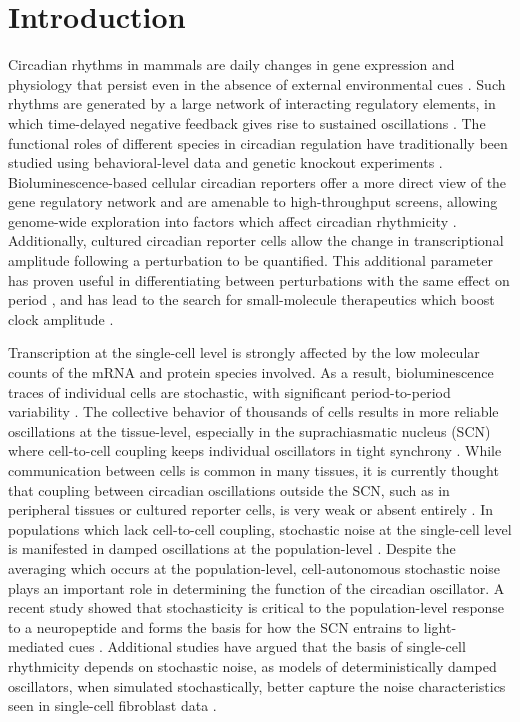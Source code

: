 \documentclass[11pt, letterpaper]{article}
\begin{document}
\section*{Introduction}

Circadian rhythms in mammals are daily changes in gene expression and physiology that persist even in the absence of external environmental cues \cite{Herzog2007}.
Such rhythms are generated by a large network of interacting regulatory elements, in which time-delayed negative feedback gives rise to sustained oscillations \cite{Ueda2005}.
The functional roles of different species in circadian regulation have traditionally been studied using behavioral-level data and genetic knockout experiments \cite{Vitaterna1994}.
Bioluminescence-based cellular circadian reporters offer a more direct view of the gene regulatory network \cite{Balsalobre1998} and are amenable to high-throughput screens, allowing genome-wide exploration into factors which affect circadian rhythmicity \cite{Zhang2009}.
Additionally, cultured circadian reporter cells allow the change in transcriptional amplitude following a perturbation to be quantified.
This additional parameter has proven useful in differentiating between perturbations with the same effect on period \cite{St.John2014}, and has lead to the search for small-molecule therapeutics which boost clock amplitude \cite{Chen2013}.

Transcription at the single-cell level is strongly affected by the low molecular counts of the mRNA and protein species involved. 
As a result, bioluminescence traces of individual cells are stochastic, with significant period-to-period variability \cite{Welsh2004}. 
The collective behavior of thousands of cells results in more reliable oscillations at the tissue-level, especially in the suprachiasmatic nucleus (SCN) where cell-to-cell coupling keeps individual oscillators in tight synchrony \cite{Herzog2004}. 
While communication between cells is common in many tissues, it is currently thought that coupling between circadian oscillations outside the SCN, such as in peripheral tissues or cultured reporter cells, is very weak or absent entirely \cite{Guenthner2014, Noguchi2013}.
In populations which lack cell-to-cell coupling, stochastic noise at the single-cell level is manifested in damped oscillations at the population-level \cite{Welsh2004}. 
Despite the averaging which occurs at the population-level, cell-autonomous stochastic noise plays an important role in determining the function of the circadian oscillator.
A recent study showed that stochasticity is critical to the population-level response to a neuropeptide and forms the basis for how the SCN entrains to light-mediated cues \cite{An2013}.
Additional studies have argued that the basis of single-cell rhythmicity depends on stochastic noise, as models of deterministically damped oscillators, when simulated stochastically, better capture the noise characteristics seen in single-cell fibroblast data \cite{Westermark2009}.
\end{document}
